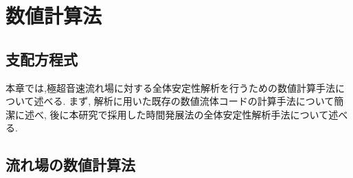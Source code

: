 %
\chapter{数値計算法}
\section{支配方程式}
本章では,極超音速流れ場に対する全体安定性解析を行うための数値計算手法について述べる.
まず,
解析に用いた既存の数値流体コード\cite{ishihara}の計算手法について簡潔に述べ,
後に本研究で採用した時間発展法の全体安定性解析手法について述べる.

\section{流れ場の数値計算法}
